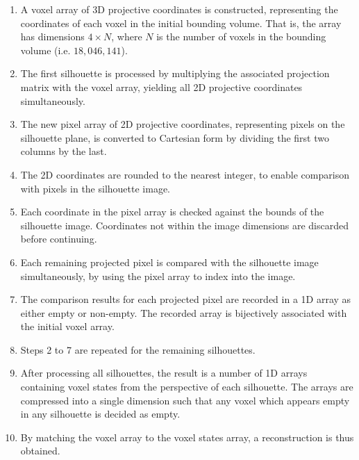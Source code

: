 \begin{enumerate}
  \item A voxel array of 3D projective coordinates is constructed, representing the coordinates of each voxel in the initial bounding volume. That is, the array has dimensions $4\times N$, where $N$ is the number of voxels in the bounding volume (i.e. $18,046,141$).

  \item The first silhouette is processed by multiplying the associated projection matrix with the voxel array, yielding all 2D projective coordinates simultaneously.

  \item The new pixel array of 2D projective coordinates, representing pixels on the silhouette plane, is converted to Cartesian form by dividing the first two columns by the last.

  \item The 2D coordinates are rounded to the nearest integer, to enable comparison with pixels in the silhouette image.

  \item Each coordinate in the pixel array is checked against the bounds of the silhouette image. Coordinates not within the image dimensions are discarded before continuing.

  \item Each remaining projected pixel is compared with the silhouette image simultaneously, by using the pixel array to index into the image.

  \item The comparison results for each projected pixel are recorded in a 1D array as either empty or non-empty. The recorded array is bijectively associated with the initial voxel array.

  \item Steps 2 to 7 are repeated for the remaining silhouettes.

  \item After processing all silhouettes, the result is a number of 1D arrays containing voxel states from the perspective of each silhouette. The arrays are compressed into a single dimension such that any voxel which appears empty in any silhouette is decided as empty.

  \item By matching the voxel array to the voxel states array, a reconstruction is thus obtained.

\end{enumerate}

